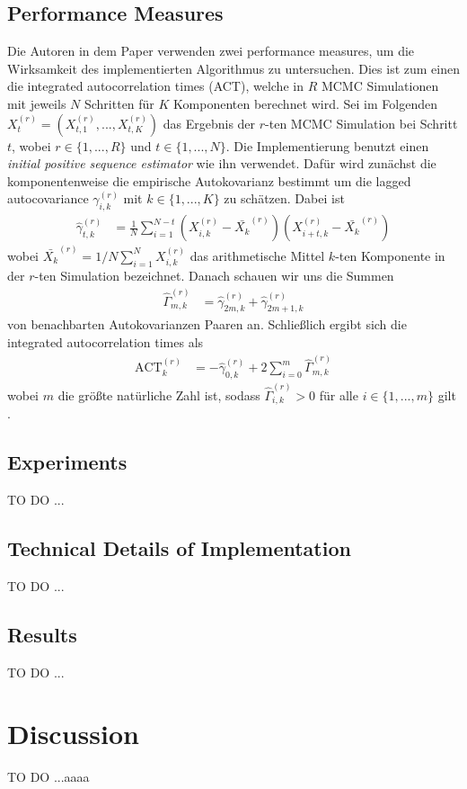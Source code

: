 \documentclass{scrartcl}
\begin{document}
\subsection{Performance Measures}
Die Autoren in dem Paper \cite{lau2019} verwenden zwei performance measures, um die Wirksamkeit des implementierten
Algorithmus zu untersuchen. Dies ist zum einen die integrated autocorrelation times (ACT), welche in $R$ MCMC
Simulationen mit jeweils $N$ Schritten für $K$ Komponenten berechnet wird. Sei im Folgenden
$X_t^{(r)}=(X_{t,1}^{(r)},...,X_{t,K}^{(r)})$ das Ergebnis der $r$-ten MCMC Simulation bei Schritt $t$, wobei
$r\in\{1,...,R\}$ und $t\in\{1,...,N\}$. Die Implementierung benutzt einen \textit{initial positive sequence estimator}
wie ihn \cite{geyer1992} verwendet. Dafür wird zunächst die komponentenweise die empirische Autokovarianz bestimmt um
die lagged autocovariance $\gamma_{i,k}^{(r)}$ mit $k\in\{1,...,K\}$ zu schätzen. Dabei ist
\begin{align*}
	\hat{\gamma}_{t,k}^{(r)}&=\frac{1}{N}\sum\limits_{i=1}^{N-t}(X_{i,k}^{(r)}-\bar{X_k}^{(r)})(X_{i+t,k}^{(r)}-\bar{X_k}^{(r)})
\end{align*} 
wobei $\bar{X_k}^{(r)}=1/N\sum\nolimits_{i=1}^NX_{i,k}^{(r)}$ das arithmetische Mittel $k$-ten Komponente in der $r$-ten
Simulation bezeichnet. Danach schauen wir uns die Summen
\begin{align*}
	\hat{\Gamma}_{m,k}^{(r)} &= \hat{\gamma}_{2m,k}^{(r)} + \hat{\gamma}_{2m+1,k}^{(r)}
\end{align*}
von benachbarten Autokovarianzen Paaren an. Schließlich ergibt sich die integrated autocorrelation times als
\begin{align*}
	\text{ACT}_k^{(r)}&=-\hat{\gamma}_{0,k}^{(r)}+2\sum\limits_{i=0}^{m}\hat{\Gamma}_{m,k}^{(r)}
\end{align*} 
wobei $m$ die größte natürliche Zahl ist, sodass $\hat{\Gamma}_{i,k}^{(r)} > 0$ für alle $i\in\{1,...,m\}$ gilt
\cite{geyer1992}.

\subsection{Experiments}
TO DO ...

\subsection{Technical Details of Implementation}
TO DO ...

\subsection{Results}
TO DO ...

\section{Discussion}
TO DO ...aaaa



\end{document}
